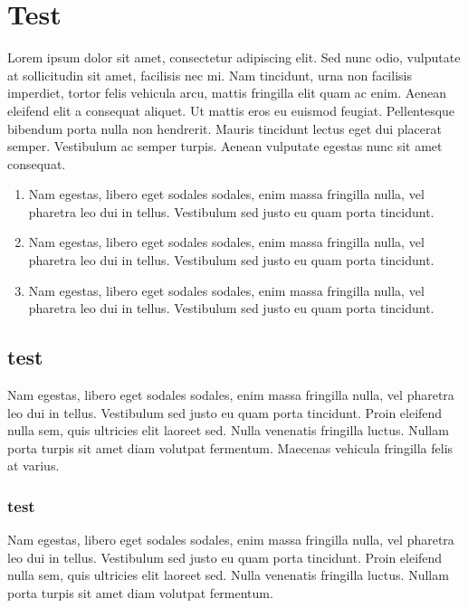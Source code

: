\chapter{Test}
{

    Lorem ipsum dolor sit amet, consectetur adipiscing elit.
    Sed nunc odio, vulputate at sollicitudin sit amet, facilisis nec mi.
    Nam tincidunt, urna non facilisis imperdiet, tortor felis vehicula arcu,
    mattis fringilla elit quam ac enim. Aenean eleifend elit a consequat aliquet.
    Ut mattis eros eu euismod feugiat. Pellentesque bibendum porta nulla non hendrerit.
    Mauris tincidunt lectus eget dui placerat semper. Vestibulum ac semper turpis.
    Aenean vulputate egestas nunc sit amet consequat.

    \begin{enumerate}
        \item Nam egestas, libero eget sodales sodales, enim massa fringilla nulla, vel pharetra leo dui in tellus.
        Vestibulum sed justo eu quam porta tincidunt.
        \item Nam egestas, libero eget sodales sodales, enim massa fringilla nulla, vel pharetra leo dui in tellus.
        Vestibulum sed justo eu quam porta tincidunt.
        \item Nam egestas, libero eget sodales sodales, enim massa fringilla nulla, vel pharetra leo dui in tellus.
        Vestibulum sed justo eu quam porta tincidunt.
    \end{enumerate}
    
    \section{test}
    {
        Nam egestas, libero eget sodales sodales, enim massa fringilla nulla, vel pharetra leo dui in tellus.
        Vestibulum sed justo eu quam porta tincidunt. Proin eleifend nulla sem,
        quis ultricies elit laoreet sed. Nulla venenatis fringilla luctus.
        Nullam porta turpis sit amet diam volutpat fermentum.
        Maecenas vehicula fringilla felis at varius.
    }

    \subsection{test}
    {
        Nam egestas, libero eget sodales sodales, enim massa fringilla nulla, vel pharetra leo dui in tellus.
        Vestibulum sed justo eu quam porta tincidunt. Proin eleifend nulla sem,
        quis ultricies elit laoreet sed. Nulla venenatis fringilla luctus.
        Nullam porta turpis sit amet diam volutpat fermentum.

}}
